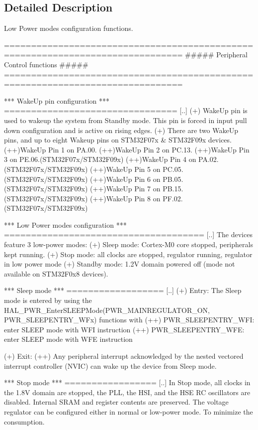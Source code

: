 \subsection{Detailed Description}
Low Power modes configuration functions. 

\begin{DoxyVerb} ===============================================================================
                 ##### Peripheral Control functions #####
 ===============================================================================
    
    *** WakeUp pin configuration ***
    ================================
    [..]
      (+) WakeUp pin is used to wakeup the system from Standby mode. This pin is
          forced in input pull down configuration and is active on rising edges.
      (+) There are two WakeUp pins, and up to eight Wakeup pins on STM32F07x & STM32F09x devices.
         (++)WakeUp Pin 1 on PA.00.
         (++)WakeUp Pin 2 on PC.13.
         (++)WakeUp Pin 3 on PE.06.(STM32F07x/STM32F09x)
         (++)WakeUp Pin 4 on PA.02.(STM32F07x/STM32F09x)
         (++)WakeUp Pin 5 on PC.05.(STM32F07x/STM32F09x)
         (++)WakeUp Pin 6 on PB.05.(STM32F07x/STM32F09x)
         (++)WakeUp Pin 7 on PB.15.(STM32F07x/STM32F09x)
         (++)WakeUp Pin 8 on PF.02.(STM32F07x/STM32F09x)

    *** Low Power modes configuration ***
    =====================================
    [..]
      The devices feature 3 low-power modes:
      (+) Sleep mode: Cortex-M0 core stopped, peripherals kept running.
      (+) Stop mode: all clocks are stopped, regulator running, regulator
          in low power mode
      (+) Standby mode: 1.2V domain powered off (mode not available on STM32F0x8 devices).

   *** Sleep mode ***
   ==================
    [..]
      (+) Entry:
          The Sleep mode is entered by using the HAL_PWR_EnterSLEEPMode(PWR_MAINREGULATOR_ON, PWR_SLEEPENTRY_WFx)
              functions with
          (++) PWR_SLEEPENTRY_WFI: enter SLEEP mode with WFI instruction
          (++) PWR_SLEEPENTRY_WFE: enter SLEEP mode with WFE instruction
     
      (+) Exit:
        (++) Any peripheral interrupt acknowledged by the nested vectored interrupt
              controller (NVIC) can wake up the device from Sleep mode.

   *** Stop mode ***
   =================
    [..]
      In Stop mode, all clocks in the 1.8V domain are stopped, the PLL, the HSI,
      and the HSE RC oscillators are disabled. Internal SRAM and register contents
      are preserved.
      The voltage regulator can be configured either in normal or low-power mode.
      To minimize the consumption.


\end{DoxyVerb}
